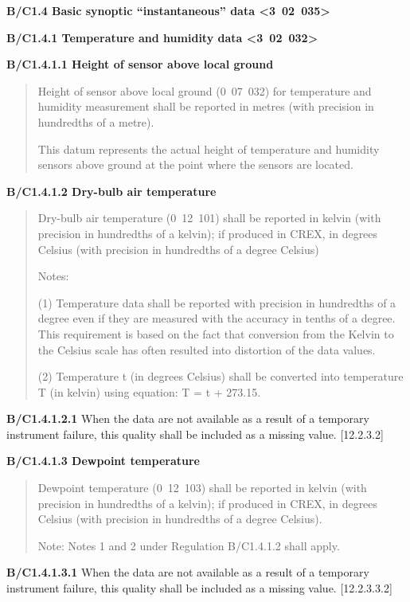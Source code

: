 \textbf{B/C1.4 Basic synoptic ``instantaneous'' data \textless3~02~035\textgreater{}}

\textbf{B/C1.4.1 Temperature and humidity data \textless3~02~032\textgreater{}}

\textbf{B/C1.4.1.1 Height of sensor above local ground}

\begin{quote}
Height of sensor above local ground (0~07~032) for temperature and humidity measurement shall be reported in metres (with precision in hundredths of a metre).

This datum represents the actual height of temperature and humidity sensors above ground at the point where the sensors are located.
\end{quote}

\textbf{B/C1.4.1.2 Dry-bulb air temperature}

\begin{quote}
Dry-bulb air temperature (0~12~101) shall be reported in kelvin (with precision in hundredths of a kelvin); if produced in CREX, in degrees Celsius (with precision in hundredths of a degree Celsius)

Notes:

(1) Temperature data shall be reported with precision in hundredths of a degree even if they are measured with the accuracy in tenths of a degree. This requirement is based on the fact that conversion from the Kelvin to the Celsius scale has often resulted into distortion of the data values.

(2) Temperature t (in degrees Celsius) shall be converted into temperature T (in kelvin) using equation: T = t + 273.15.
\end{quote}

\textbf{B/C1.4.1.2.1} When the data are not available as a result of a temporary instrument failure, this quality shall be included as a missing value. {[}12.2.3.2{]}

\textbf{B/C1.4.1.3 Dewpoint temperature}

\begin{quote}
Dewpoint temperature (0~12~103) shall be reported in kelvin (with precision in hundredths of a kelvin); if produced in CREX, in degrees Celsius (with precision in hundredths of a degree Celsius).

Note: Notes 1 and 2 under Regulation B/C1.4.1.2 shall apply.
\end{quote}

\textbf{B/C1.4.1.3.1} When the data are not available as a result of a temporary instrument failure, this quality shall be included as a missing value. {[}12.2.3.3.2{]}

